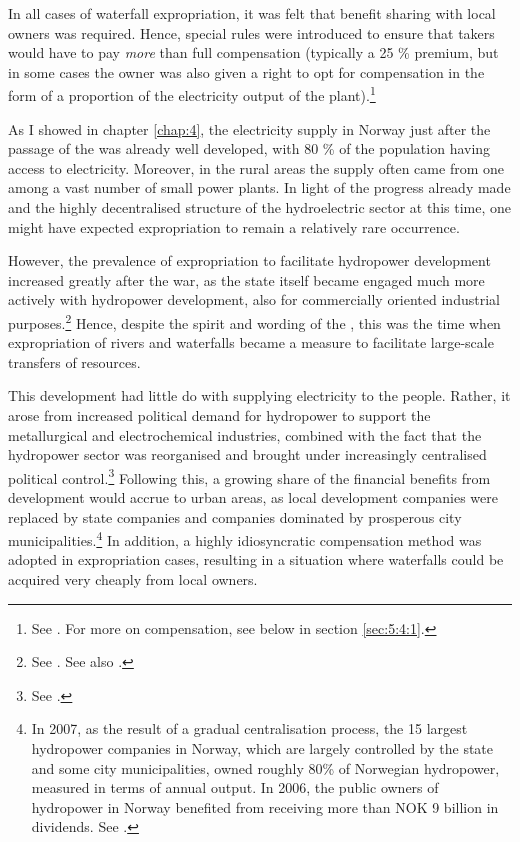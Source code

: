 In all cases of waterfall expropriation, it was felt that benefit sharing with local owners was required. Hence, special rules were introduced to ensure that takers would have to pay {\it more} than full compensation (typically a 25 \% premium, but in some cases the owner was also given a right to opt for compensation in the form of a proportion of the electricity output of the plant).\footnote{See \cite[70-91,184,210]{sorensen41}. For more on compensation, see below in section \ref{sec:5:4:1}.}

As I showed in chapter \ref{chap:4}, the electricity supply in Norway just after the passage of the \cite{wra40} was already well developed, with 80 \% of the population having access to electricity. Moreover, in the rural areas the supply often came from one among a vast number of small power plants. In light of the progress already made and the highly decentralised structure of the hydroelectric sector at this time, one might have expected expropriation to remain a relatively rare occurrence.

However, the prevalence of expropriation to facilitate hydropower development increased greatly after the war, as the state itself became engaged much more actively with hydropower development, also for commercially oriented industrial purposes.\footnote{See \cite[59-71]{thue96}. See also \cite{skjold06}.} Hence, despite the spirit and wording of the \cite{wra40}, this was the time when expropriation of rivers and waterfalls became a measure to facilitate large-scale transfers of resources.

This development had little do with supplying electricity to the people. Rather, it arose from increased political demand for hydropower to support the metallurgical and electrochemical industries, combined with the fact that the hydropower sector was reorganised and brought under increasingly centralised political control.\footnote{See \cite[69-71]{thue96}.} Following this, a growing share of the financial benefits from development would accrue to urban areas, as local development companies were replaced by state companies and companies dominated by prosperous city municipalities.\footnote{In 2007, as the result of a gradual centralisation process, the 15 largest hydropower companies in Norway, which are largely controlled by the state and some city municipalities, owned roughly 80\% of Norwegian hydropower, measured in terms of annual output. In 2006, the public owners of hydropower in Norway benefited from receiving more than NOK 9 billion in dividends. See \cite[28]{otprp61}.} In addition, a highly idiosyncratic compensation method was adopted in expropriation cases, resulting in a situation where waterfalls could be acquired very cheaply from local owners.

